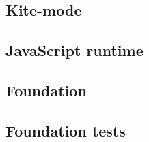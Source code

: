 
\subsection{Kite-mode}
\label{kite-mode}


\subsection{JavaScript runtime}
\label{kt-runtime}


\subsection{Foundation}
\label{foundation}


\subsection{Foundation tests}
\label{sec:foundation-tests}

